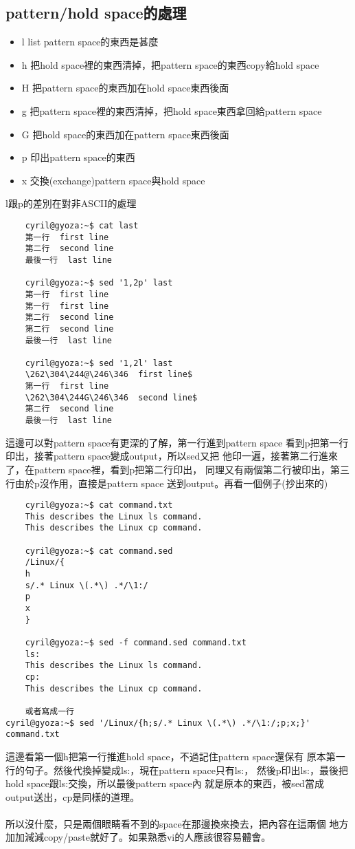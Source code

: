     \subsection{pattern/hold space的處理}
    \begin{itemize}
    \item l list pattern space的東西是甚麼
    \item h 把hold space裡的東西清掉，把pattern space的東西copy給hold space
    \item H 把pattern space的東西加在hold space東西後面
    \item g 把pattern space裡的東西清掉，把hold space東西拿回給pattern space
    \item G 把hold space的東西加在pattern space東西後面
    \item p 印出pattern space的東西
    \item x 交換(exchange)pattern space與hold space
    \end{itemize}
    l跟p的差別在對非ASCII的處理
    \begin{verbatim}
    cyril@gyoza:~$ cat last
    第一行  first line
    第二行  second line
    最後一行  last line

    cyril@gyoza:~$ sed '1,2p' last
    第一行  first line
    第一行  first line
    第二行  second line
    第二行  second line
    最後一行  last line

    cyril@gyoza:~$ sed '1,2l' last
    \262\304\244@\246\346  first line$
    第一行  first line
    \262\304\244G\246\346  second line$
    第二行  second line
    最後一行  last line
    \end{verbatim}
    這邊可以對pattern space有更深的了解，第一行進到pattern space
    看到p把第一行印出，接著pattern space變成output，所以sed又把
    他印一遍，接著第二行進來了，在pattern space裡，看到p把第二行印出，
    同理又有兩個第二行被印出，第三行由於p沒作用，直接是pattern space
    送到output。再看一個例子(抄出來的)
    \begin{verbatim}
    cyril@gyoza:~$ cat command.txt
    This describes the Linux ls command.
    This describes the Linux cp command.
    
    cyril@gyoza:~$ cat command.sed
    /Linux/{
    h
    s/.* Linux \(.*\) .*/\1:/
    p
    x
    }
    
    cyril@gyoza:~$ sed -f command.sed command.txt
    ls:
    This describes the Linux ls command.
    cp:
    This describes the Linux cp command.

    或者寫成一行
cyril@gyoza:~$ sed '/Linux/{h;s/.* Linux \(.*\) .*/\1:/;p;x;}' command.txt
    \end{verbatim}
    這邊看第一個h把第一行推進hold space，不過記住pattern space還保有
    原本第一行的句子。然後代換掉變成ls:，現在pattern space只有ls:，
    然後p印出ls:，最後把hold space跟ls:交換，所以最後pattern space內
    就是原本的東西，被sed當成output送出，cp是同樣的道理。
    \\\\
    所以沒什麼，只是兩個眼睛看不到的space在那邊換來換去，把內容在這兩個
    地方加加減減copy/paste就好了。如果熟悉vi的人應該很容易體會。
